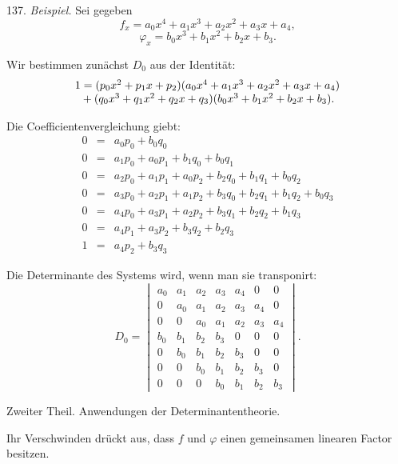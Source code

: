\documentclass[11pt]{article}
\providecommand{\weberpage}[1]{}
\providecommand{\weq}[2]{\begin{equation}\tag{#1}#2\end{equation}}
\begin{document}
137. \textit{Beispiel.} Sei gegeben
\[
f_x = a_0x^4+a_1x^3+a_2x^2+a_3x+a_4,
\]
\[
\varphi_x = b_0x^3+b_1x^2+b_2x+b_3.
\]

Wir bestimmen zunächst $D_0$ aus der Identität:
\[
\begin{array}{l}
1 = (p_0x^2+p_1x+p_2)(a_0x^4+a_1x^3+a_2x^2+a_3x+a_4) \\
\hphantom{1} + (q_0x^3+q_1x^2+q_2x+q_3)(b_0x^3+b_1x^2+b_2x+b_3).
\end{array}
\]

Die Coefficientenvergleichung giebt:
\weq{1}{
\begin{array}{rcl}
0 &=& a_0p_0 + b_0q_0 \\
0 &=& a_1p_0+a_0p_1 + b_1q_0+b_0q_1 \\
0 &=& a_2p_0+a_1p_1+a_0p_2 + b_2q_0+b_1q_1+b_0q_2 \\
0 &=& a_3p_0+a_2p_1+a_1p_2 + b_3q_0+b_2q_1+b_1q_2+b_0q_3 \\
0 &=& a_4p_0+a_3p_1+a_2p_2 + b_3q_1+b_2q_2+b_1q_3 \\
0 &=& a_4p_1+a_3p_2 + b_3q_2+b_2q_3 \\
1 &=& a_4p_2 + b_3q_3
\end{array}}

Die Determinante des Systems wird, wenn man sie transponirt:
\[
D_0 =
\begin{vmatrix}
a_0 & a_1 & a_2 & a_3 & a_4 & 0 & 0 \\
0 & a_0 & a_1 & a_2 & a_3 & a_4 & 0 \\
0 & 0 & a_0 & a_1 & a_2 & a_3 & a_4 \\
b_0 & b_1 & b_2 & b_3 & 0 & 0 & 0 \\
0 & b_0 & b_1 & b_2 & b_3 & 0 & 0 \\
0 & 0 & b_0 & b_1 & b_2 & b_3 & 0 \\
0 & 0 & 0 & b_0 & b_1 & b_2 & b_3
\end{vmatrix}.
\]


\weberpage{144}

\begin{center}
Zweiter Theil. Anwendungen der Determinantentheorie.
\end{center}

Ihr Verschwinden drückt aus, dass $f$ und $\varphi$ einen gemeinsamen linearen Factor besitzen.
\end{document}
